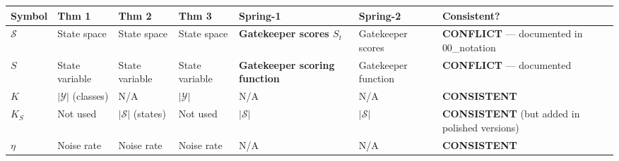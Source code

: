 \documentclass[
  12pt,
]{ctexart}
\begin{document}
\begin{longtable}[]{@{}
  >{\raggedright\arraybackslash}p{}
  >{\raggedright\arraybackslash}p{}
  >{\raggedright\arraybackslash}p{}
  >{\raggedright\arraybackslash}p{}
  >{\raggedright\arraybackslash}p{}
  >{\raggedright\arraybackslash}p{}
  >{\raggedright\arraybackslash}p{}@{}}
\toprule\noalign{}
\begin{minipage}[b]{\linewidth}\raggedright
Symbol
\end{minipage} & \begin{minipage}[b]{\linewidth}\raggedright
Thm 1
\end{minipage} & \begin{minipage}[b]{\linewidth}\raggedright
Thm 2
\end{minipage} & \begin{minipage}[b]{\linewidth}\raggedright
Thm 3
\end{minipage} & \begin{minipage}[b]{\linewidth}\raggedright
Spring-1
\end{minipage} & \begin{minipage}[b]{\linewidth}\raggedright
Spring-2
\end{minipage} & \begin{minipage}[b]{\linewidth}\raggedright
Consistent?
\end{minipage} \\
\midrule\noalign{}
\endhead
\bottomrule\noalign{}
\endlastfoot
\(\mathcal{S}\) & State space & State space & State space &
\textbf{Gatekeeper scores \(S_t\)} & Gatekeeper scores &
\textbf{CONFLICT} --- documented in 00\_notation \\
\(S\) & State variable & State variable & State variable &
\textbf{Gatekeeper scoring function} & Gatekeeper function &
\textbf{CONFLICT} --- documented \\
\(K\) & \(|\mathcal{Y}|\) (classes) & N/A & \(|\mathcal{Y}|\) & N/A &
N/A & \textbf{CONSISTENT} \\
\(K_S\) & Not used & \(|\mathcal{S}|\) (states) & Not used &
\(|\mathcal{S}|\) & \(|\mathcal{S}|\) & \textbf{CONSISTENT} (but added
in polished versions) \\
\(\eta\) & Noise rate & Noise rate & Noise rate & N/A & N/A &
\textbf{CONSISTENT} \\

\end{longtable}
\end{document}
